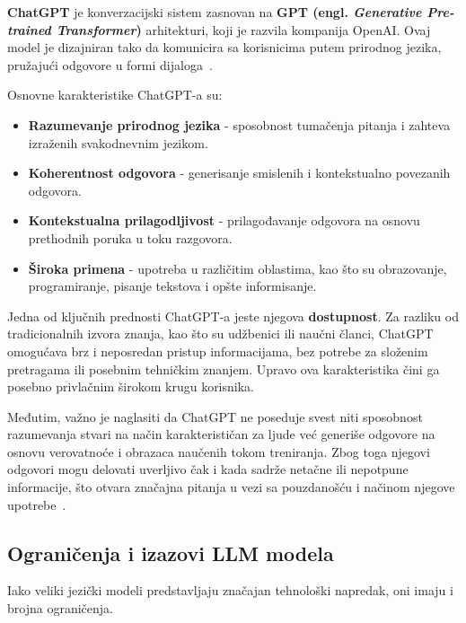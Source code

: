 \documentclass[a4paper, 12pt]{article}
\begin{document}
\textbf{ChatGPT} je konverzacijski sistem zasnovan na \textbf{GPT (engl. \textit{Generative Pre-trained Transformer})} arhitekturi, koji je razvila kompanija OpenAI. Ovaj model je dizajniran tako da komunicira sa korisnicima putem prirodnog jezika, pružajući odgovore u formi dijaloga~\cite{openai2023}.

Osnovne karakteristike ChatGPT-a su:
\begin{itemize}
    \item \textbf{Razumevanje prirodnog jezika} - sposobnost tumačenja pitanja i zahteva izraženih svakodnevnim jezikom.
    \item \textbf{Koherentnost odgovora} - generisanje smislenih i kontekstualno povezanih odgovora.
    \item \textbf{Kontekstualna prilagodljivost} - prilagođavanje odgovora na osnovu prethodnih poruka u toku razgovora.
    \item \textbf{Široka primena} - upotreba u različitim oblastima, kao što su obrazovanje, programiranje, pisanje tekstova i opšte informisanje.
\end{itemize}


Jedna od ključnih prednosti ChatGPT-a jeste njegova \textbf{dostupnost}. Za razliku od tradicionalnih izvora znanja, kao što su udžbenici ili naučni članci, ChatGPT omogućava brz i neposredan pristup informacijama, bez potrebe za složenim pretragama ili posebnim tehničkim znanjem. Upravo ova karakteristika čini ga posebno privlačnim širokom krugu korisnika.

Međutim, važno je naglasiti da ChatGPT ne poseduje svest niti sposobnost razumevanja stvari na način karakterističan za ljude već generiše odgovore na osnovu verovatnoće i obrazaca naučenih tokom treniranja. Zbog toga njegovi odgovori mogu delovati uverljivo čak i kada sadrže netačne ili nepotpune informacije, što otvara značajna pitanja u vezi sa pouzdanošću i načinom njegove upotrebe~\cite{bender2021}.


\subsection{Ograničenja i izazovi LLM modela}

Iako veliki jezički modeli predstavljaju značajan tehnološki napredak, oni imaju i brojna ograničenja. 
\end{document}
